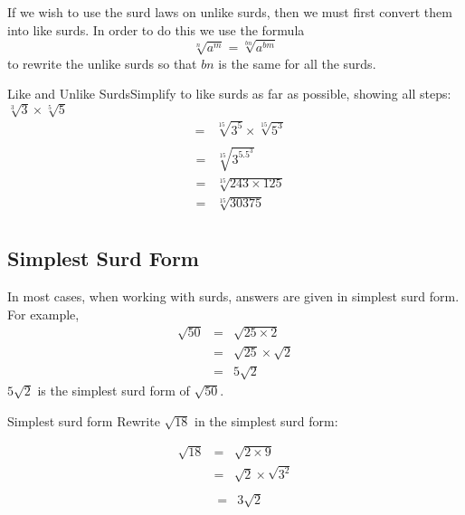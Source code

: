 If we wish to use the surd laws on unlike surds, then we must first convert
them into like surds. In order to do this we use the formula
\begin{equation} 
\label{eq:mn:s:like}
\sqrt[n]{a^m}=\sqrt[bn]{a^{bm}}
\end{equation}
to rewrite the unlike surds so that $bn$ is the same for all the surds.

\begin{wex}{Like and Unlike Surds}{Simplify to like surds as far as possible, showing all steps:  $\sqrt[3]{3}\times \sqrt[5]{5}$}{
\begin{eqnarray*}
&=&\sqrt[15]{3^5}\times \sqrt[15]{5^3}\\
\end{eqnarray*}
\begin{eqnarray*}
&=&\sqrt[15]{3^5.5^3}\\
&=&\sqrt[15]{243\times 125}\\
&=&\sqrt[15]{30 375}\\
\end{eqnarray*}
}
\end{wex}

\subsection{Simplest Surd Form}
In most cases, when working with surds, answers are given in simplest surd form.
For example,
\begin{eqnarray*}
\sqrt{50} &=& \sqrt{25 \times 2}\\
&=& \sqrt{25}\times \sqrt{2}\\
&=& 5\sqrt{2}
\end{eqnarray*}
$5\sqrt{2}$ is the simplest surd form of $\sqrt{50}$.

\begin{wex}{Simplest surd form}
{Rewrite $\sqrt{18}$ in the simplest surd form:}{
\begin{eqnarray*}
\sqrt{18}&=& \sqrt{2 \times 9}\\
&=&\sqrt{2}\times \sqrt{3^{2}}\\
\end{eqnarray*}
\begin{eqnarray*}
 &=&3\sqrt{2}
\end{eqnarray*}

}
\end{wex}

